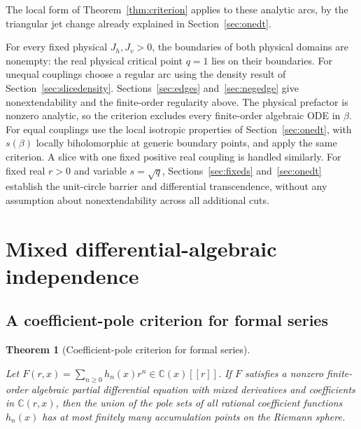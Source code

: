 \documentclass[11pt,a4paper]{article}
\numberwithin{equation}{section}
\theoremstyle{plain}
\newtheorem{theorem}{Theorem}[section]
\theoremstyle{definition}
\begin{document}
The local form of Theorem~\ref{thm:criterion} applies to these analytic arcs, by the triangular jet change already explained in Section~\ref{sec:onedt}.

For every fixed physical \(J_h,J_v>0\), the boundaries of both physical domains are nonempty: the real physical critical point \(q=1\) lies on their boundaries. For unequal couplings choose a regular arc using the density result of Section~\ref{sec:slicedensity}. Sections~\ref{sec:edges} and~\ref{sec:negedge} give nonextendability and the finite-order regularity above. The physical prefactor is nonzero analytic, so the criterion excludes every finite-order algebraic ODE in \(\beta\). For equal couplings use the local isotropic properties of Section~\ref{sec:onedt}, with \(s(\beta)\) locally biholomorphic at generic boundary points, and apply the same criterion. A slice with one fixed positive real coupling is handled similarly. For fixed real \(r>0\) and variable \(s=\sqrt q\), Sections~\ref{sec:fixeds} and~\ref{sec:onedt} establish the unit-circle barrier and differential transcendence, without any assumption about nonextendability across all additional cuts.

\section{Mixed differential-algebraic independence}\label{sec:pde}

\subsection{A coefficient-pole criterion for formal series}\label{sec:polelemma}

\begin{theorem}[Coefficient-pole criterion for formal series]\label{thm:poles}

Let \(F(r,x)=\sum_{n\ge0}h_n(x)r^n\in\mathbb C(x)[[r]]\). If \(F\) satisfies a nonzero finite-order algebraic partial differential equation with mixed derivatives and coefficients in \(\mathbb C(r,x)\), then the union of the pole sets of all rational coefficient functions \(h_n(x)\) has at most finitely many accumulation points on the Riemann sphere.

\end{theorem}
\end{document}
